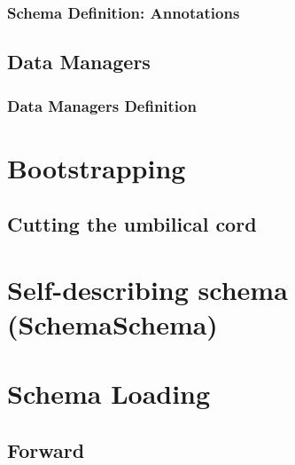 \subsubsection{Schema Definition: Annotations}\label{subsubsec:Schema Definition Annotations}

\subsection{Data Managers}\label{sec:Data Manager Implementation}

\subsubsection{Data Managers Definition}\label{Data Managers Definition}

\section{Bootstrapping}\label{sec:Bootstrapping}

\subsection{Cutting the umbilical cord}\label{subsec:Cutting the umbilical cord}

\section{Self-describing schema (SchemaSchema)}\label{sec:SchemaSchema}

\section{Schema Loading}\label{sec:Schema Loading}

\subsection{Forward}\label{subsec:Schema Loading Forward}

